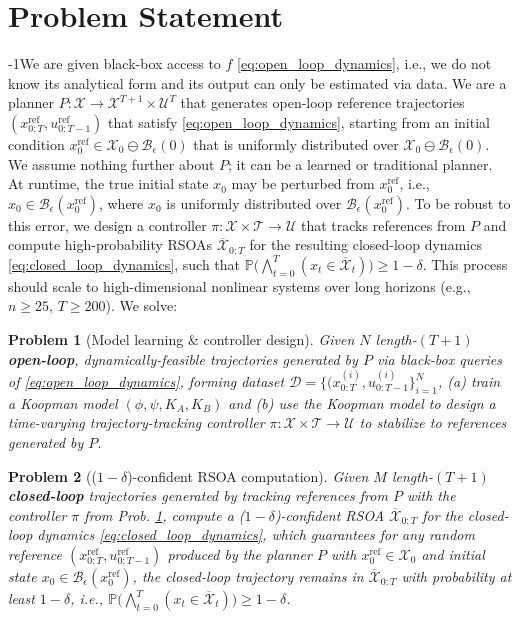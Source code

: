 \documentclass{l4dc2026}
\newtheorem{problem}{Problem}
\begin{document}
\section{Problem Statement}
\label{problem_statement}
\looseness-1We are given black-box access to $f$ \eqref{eq:open_loop_dynamics}, i.e., we do not know its analytical form and its output can only be estimated via data. We are a planner $P: \mathcal{X} \rightarrow \mathcal{X}^{T+1} \times \mathcal{U}^T$ that generates open-loop reference trajectories $(x^\textrm{ref}_{0:T}, u^\textrm{ref}_{0:T-1})$ that satisfy \eqref{eq:open_loop_dynamics}, starting from an initial condition $x_0^\textrm{ref} \in \mathcal{X}_0 \ominus \mathcal{B}_\epsilon(0)$ that is uniformly distributed over $\mathcal{X}_0 \ominus \mathcal{B}_\epsilon(0)$.  We assume nothing further about $P$; it can be a learned or traditional planner. At runtime, the true initial state $x_0$ may be perturbed from $x_0^\textrm{ref}$, i.e., $x_0 \in \mathcal{B}_\epsilon(x_0^\textrm{ref})$, where $x_0$ is uniformly distributed over $\mathcal{B}_\epsilon(x_0^\textrm{ref})$. To be robust to this error, we design a controller $\pi: \mathcal{X}\times \mathcal{T}\rightarrow \mathcal{U}$ that tracks references from $P$ and compute high-probability RSOAs $\overline{\mathcal{X}}_{0:T}$ for the resulting closed-loop dynamics \eqref{eq:closed_loop_dynamics}, such that $\mathbb{P}\big(\bigwedge_{t=0}^T (x_t \in \overline{\mathcal{X}}_t) \big) \ge 1-\delta$. This process should scale to high-dimensional nonlinear systems over long horizons (e.g., $n \ge 25$, $T \ge 200$). We solve:
\begin{problem}[Model learning \& controller design]\label{prob:koopman}
Given $N$ length-$(T+1)$ \textbf{open-loop}, dynamically-feasible trajectories generated by $P$ via black-box queries of \eqref{eq:open_loop_dynamics}, forming dataset $\mathcal{D}=\{(x_{0:T}^{(i)},u_{0:T-1}^{(i)}\}_{i=1}^N$, (a) train a Koopman model $(\phi,\psi,K_{A},K_{B})$ and (b) use the Koopman model to design a time-varying trajectory-tracking controller $\pi: \mathcal{X} \times \mathcal{T} \rightarrow \mathcal{U}$ to stabilize to references generated by $P$.
\end{problem}
\begin{problem}[($1-\delta$)-confident RSOA computation]\label{prob:verification}
Given $M$ length-$(T+1)$ \textbf{closed-loop} trajectories generated by tracking references from $P$ with the controller $\pi$ from Prob. \ref{prob:koopman}, compute a ($1-\delta$)-confident RSOA $\overline{\mathcal{X}}_{0:T}$ for the closed-loop dynamics \eqref{eq:closed_loop_dynamics}, which guarantees for any random reference $(x^\textrm{ref}_{0:T}, u^\textrm{ref}_{0:T-1})$ produced by the planner $P$ with $x_0^\textrm{ref} \in \mathcal{X}_0$ and initial state $x_0 \in \mathcal{B}_\epsilon(x_0^\textrm{ref})$, the closed-loop trajectory remains in $\overline{\mathcal{X}}_{0:T}$ with probability at least $1-\delta$, i.e., $\mathbb{P}\big(\bigwedge_{t=0}^T (x_t \in \overline{\mathcal{X}}_t) \big) \ge 1-\delta$.
\end{problem}
 
\end{document}
